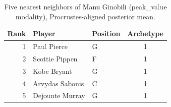 \begin{table}[htbp]
  \centering\small
  \begin{tabular}{rllc}
    \toprule
    Rank & Player & Position & Archetype \\
    \midrule
    1 & Paul Pierce & G & 1 \\
    2 & Scottie Pippen & F & 1 \\
    3 & Kobe Bryant & G & 1 \\
    4 & Arvydas Sabonis & C & 1 \\
    5 & Dejounte Murray & G & 1 \\
    \bottomrule
  \end{tabular}
  \caption{Five nearest neighbors of Manu Ginobili (peak_value modality), Procrustes-aligned posterior mean.}
  \label{tab:Manu_Ginobili_neighbors_peak_value}
\end{table}

